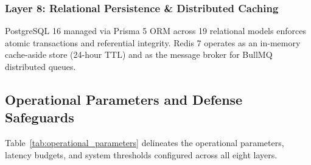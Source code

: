\documentclass[journal]{IEEEtran}
\begin{document}
\subsubsection{Layer 8: Relational Persistence \& Distributed Caching}
PostgreSQL 16 managed via Prisma 5 ORM across 19 relational models enforces atomic transactions and referential integrity. Redis 7 operates as an in-memory cache-aside store (24-hour TTL) and as the message broker for BullMQ distributed queues.

\subsection{Operational Parameters and Defense Safeguards}
Table~\ref{tab:operational_parameters} delineates the operational parameters, latency budgets, and system thresholds configured across all eight layers.
\end{document}
